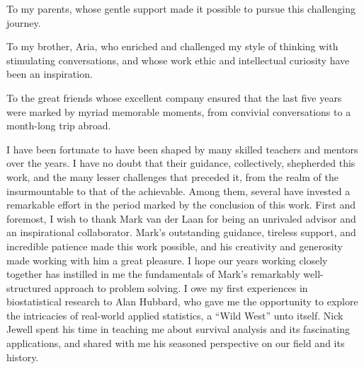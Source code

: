 \documentclass{ucbthesis}
\begin{document}


\maketitle
\copyrightpage



\begin{frontmatter}

\begin{dedication}
\null\vfil
\begin{center}
\vspace{12pt}

To my parents, whose gentle support made it possible to pursue this challenging
journey.

\vspace{22pt}

To my brother, Aria, who enriched and challenged my style of thinking with
stimulating conversations, and whose work ethic and intellectual curiosity have
been an inspiration.

\vspace{22pt}

To the great friends whose excellent company ensured that the last five years
were marked by myriad memorable moments, from convivial conversations to
a month-long trip abroad.

\end{center}
\vfil\null
\end{dedication}


\tableofcontents
\clearpage
\listoffigures
\clearpage
\listoftables

\begin{acknowledgements}

I have been fortunate to have been shaped by many skilled teachers and mentors
over the years. I have no doubt that their guidance, collectively, shepherded
this work, and the many lesser challenges that preceded it, from the realm of
the insurmountable to that of the achievable. Among them, several have invested
a remarkable effort in the period marked by the conclusion of this work. First
and foremost, I wish to thank Mark van der Laan for being an unrivaled advisor
and an inspirational collaborator. Mark's outstanding guidance, tireless
support, and incredible patience made this work possible, and his creativity and
generosity made working with him a great pleasure. I hope our years working
closely together has instilled in me the fundamentals of Mark's remarkably
well-structured approach to problem solving. I owe my first experiences in
biostatistical research to Alan Hubbard, who gave me the opportunity to explore
the intricacies of real-world applied statistics, a ``Wild West'' unto itself.
Nick Jewell spent his time in teaching me about survival analysis and its
fascinating applications, and shared with me his seasoned perspective on our
field and its history.


\end{acknowledgements}
\end{frontmatter}
\end{document}
